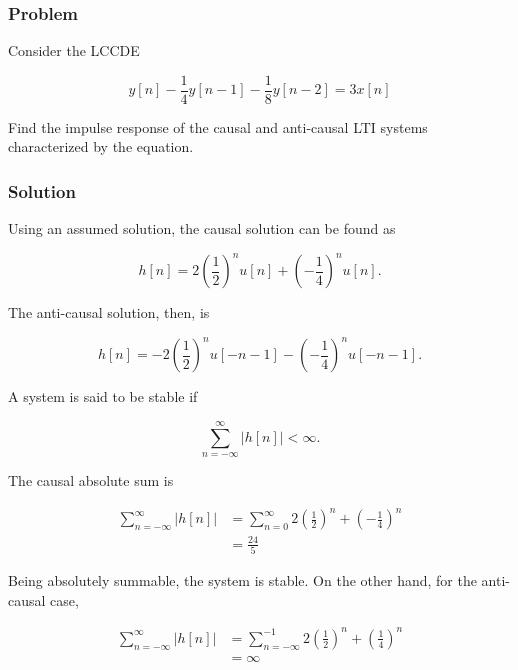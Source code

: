 \subsubsection{Problem}

Consider the LCCDE

\begin{equation}
    y[n] - \frac{1}{4} y[n-1] - \frac{1}{8} y[n-2] = 3 x[n]
\end{equation}

Find the impulse response of the causal and anti-causal LTI systems characterized by the equation.

\subsubsection{Solution}
Using an assumed solution, the causal solution can be found as

\begin{equation}
    h[n] = 2 \left( \frac{1}{2} \right)^n u[n] + \left( - \frac{1}{4} \right)^n u[n].
\end{equation}

The anti-causal solution, then, is

\begin{equation}
    h[n] = -2 \left( \frac{1}{2} \right)^n u[-n-1] - \left( - \frac{1}{4} \right)^n u[-n-1].
\end{equation}

A system is said to be stable if

\begin{equation}
    \sum\limits_{n =  - \infty }^\infty  {\left| {h[n]} \right|}  < \infty.
\end{equation}

The causal absolute sum is 

\begin{equation}
    \begin{aligned}
        \sum\limits_{n =  - \infty }^\infty  {\left| {h[n]} \right|}  &= \sum\limits_{n = 0}^\infty  {2{{\left( {\frac{1}{2}} \right)}^n} + {{\left( { - \frac{1}{4}} \right)}^n}} \\
         &= \frac{{24}}{5}
        \end{aligned}
\end{equation}

Being absolutely summable, the system is stable. On the other hand, for the anti-causal case,

\begin{equation}
    \begin{aligned}
        \sum\limits_{n =  - \infty }^\infty  {\left| {h[n]} \right|}  &= \sum\limits_{n =  - \infty }^{ - 1} {2{{\left( {\frac{1}{2}} \right)}^n} + {{\left( {\frac{1}{4}} \right)}^n}} \\
         &= \infty 
        \end{aligned}
\end{equation}

